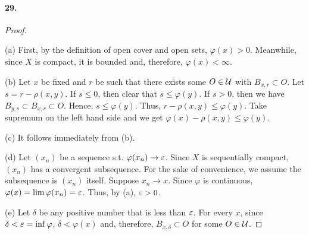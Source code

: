\paragraph{29.}
\begin{proof}
  $\,$\par
  (a) First, by the definition of open cover and open sets, $\varphi(x) > 0$.
  Meanwhile, since $X$ is compact, it is bounded and, therefore, 
  $\varphi(x) < \infty$.
  
  (b) Let $x$ be fixed and $r$ be such that there exists some $O\in \mathcal{U}$
  with $B_{x, r}\subset O$. Let $s = r - \rho(x, y)$. If $s \le 0$, then
  clear that $s \le \varphi(y)$. If $s > 0$, then we have $B_{y, s}
  \subset B_{x, r} \subset O$. Hence, $s \le \varphi(y)$. Thus, 
  $r - \rho(x, y) \le \varphi(y)$. Take supremum on the left hand side and we
  get $\varphi(x) - \rho(x, y) \le \varphi(y)$.
  
  (c) It follows immediately from (b).
  
  (d) Let $(x_n)$ be a sequence s.t. $\varphi(x_n) \to \varepsilon$. Since $X$ is
  sequentially compact, $(x_n)$ has a convergent subsequence. For the sake of 
  convenience, we assume the subsequence is $(x_n)$ itself. Suppose $x_n
  \to x$. Since $\varphi$ is continuous, $\varphi(x) = \lim\varphi(x_n) = 
  \varepsilon$. Thus, by (a), $\varepsilon > 0$.
  
  (e) Let $\delta$ be any positive number that is less than $\varepsilon$. For every
  $x$, since $\delta < \varepsilon = \inf\varphi$, $\delta < \varphi(x)$ and,
  therefore, $B_{x, \delta} \subset O$ for some $O \in \mathcal{U}$.
\end{proof}












